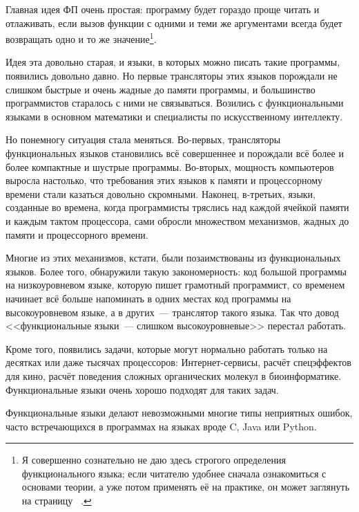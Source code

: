 \documentclass[
  paper=a4,
  fontsize=14pt,
  openany,
  appendixprefix=true
]{scrbook}
\begin{document}
Главная идея ФП очень простая: программу будет гораздо проще читать и отлаживать, если вызов функции с одними и теми же аргументами всегда будет возвращать одно и то же значение\footnote{Я совершенно сознательно не даю здесь строгого определения функционального языка; если читателю удобнее сначала ознакомиться с основами теории, а уже потом применять её на практике, он может заглянуть на страницу ~\pageref{definition}.}.

Идея эта довольно старая, и языки, в которых можно писать такие программы, появились довольно давно. Но первые трансляторы этих языков порождали не слишком быстрые и очень жадные до памяти программы, и большинство программистов старалось с ними не связываться. Возились с функциональными языками в основном математики и специалисты по искусственному интеллекту.

Но понемногу ситуация стала меняться. Во-первых, трансляторы функциональных языков становились всё совершеннее и порождали всё более и более компактные и шустрые программы. Во-вторых, мощность компьютеров выросла настолько, что требования этих языков к памяти и процессорному времени стали казаться довольно скромными. Наконец, в-третьих, языки, созданные во времена, когда программисты тряслись над каждой ячейкой памяти и каждым тактом процессора, сами обросли множеством механизмов, жадных до памяти и процессорного времени.

Многие из этих механизмов, кстати, были позаимствованы из функциональных языков. Более того, обнаружили такую закономерность: код большой программы на низкоуровневом языке, которую пишет грамотный программист, со временем начинает всё больше напоминать в одних местах код программы на высокоуровневом языке, а в других~--- транслятор такого языка. Так что довод <<функциональные языки~--- слишком высокоуровневые>> перестал работать.


Кроме того, появились задачи, которые могут нормально работать только на десятках или даже тысячах процессоров: Интернет-сервисы, расчёт спецэффектов для кино, расчёт поведения сложных органических молекул в биоинформатике. Функциональные языки очень хорошо подходят для таких задач.

Функциональные языки делают невозможными многие типы неприятных ошибок, часто встречающихся в программах на языках вроде C, Java или Python.
\end{document}
